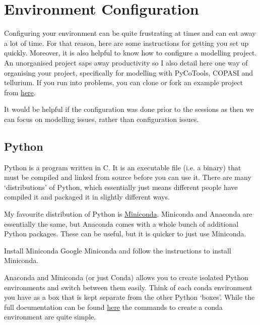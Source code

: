 \documentclass[../main]{subfiles}
\begin{document}
\section{Environment Configuration}
Configuring your environment can be quite frustrating at times and can eat away a lot of time. For that reason,
here are some instructions for getting you set up quickly. Moreover, it is also helpful to know how to configure a
modelling project. An unorganised project saps away productivity so I also detail here one way of organising your
project, specifically for modelling with PyCoTools, COPASI and tellurium. If you run
into problems, you can clone or fork an example project from \href{https://github.com/CiaranWelsh/ExampleProject}{here}.

It would be helpful if the configuration was done prior to the sessions as then we can focus on modelling
issues, rather than configuration issues.

\subsection{Python}
Python is a program written in C. It is an executable file (i.e. a binary) that must be compiled and linked
from source before you can use it. There are many `distributions' of Python, which essentially just means
different people have compiled it and packaged it in slightly different ways.

My favourite distribution of Python is \href{https://docs.conda.io/en/latest/miniconda.html}{Miniconda}. Miniconda
and Anaconda are essentially the same, but Anaconda comes with a whole bunch of additional Python packages. These
can be useful, but it is quicker to just use Miniconda.

\begin{Task}[label=InstallMiniconda]{Install Miniconda}
Google Miniconda and follow the instructions to install Miniconda.
\end{Task}


Anaconda and Miniconda (or just Conda) allows you to create isolated Python environments
and switch between them easily. Think of each conda environment you have as a box that is
kept separate from the other Python `boxes'. While the full documentation can be found \href{https://docs.conda.io/projects/conda/en/latest/user-guide/tasks/manage-environments.html}{here}
the commands to create a conda environment are quite simple.
\end{document}
